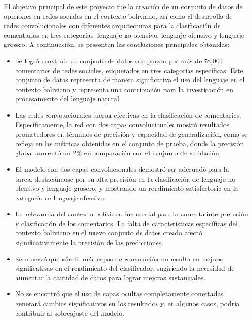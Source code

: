 El objetivo principal de este proyecto fue la creación de un conjunto de datos de opiniones en redes sociales en el contexto boliviano, así como el desarrollo de redes convolucionales con diferentes arquitecturas para la clasificación de comentarios en tres categorías: lenguaje no ofensivo, lenguaje ofensivo y lenguaje grosero. A continuación, se presentan las conclusiones principales obtenidas:

\begin{itemize}

\item Se logró construir un conjunto de datos compuesto por más de 78,000 comentarios de redes sociales, etiquetados en tres categorías específicas. Este conjunto de datos representa de manera significativa el uso del lenguaje en el contexto boliviano y representa una contribución para la investigación en procesamiento del lenguaje natural.

\item Las redes convolucionales fueron efectivas en la clasificación de comentarios. Específicamente, la red con dos capas convolucionales mostró resultados prometedores en términos de precisión y capacidad de generalización, como se refleja en las métricas obtenidas en el conjunto de prueba, donde la precisión global aumentó un 2\% en comparación con el conjunto de validación.

\item El modelo con dos capas convolucionales demostró ser adecuado para la tarea, destacándose por su alta precisión en la clasificación de lenguaje no ofensivo y lenguaje grosero, y mostrando un rendimiento satisfactorio en la categoría de lenguaje ofensivo.

\item La relevancia del contexto boliviano fue crucial para la correcta interpretación y clasificación de los comentarios. La falta de características específicas del contexto boliviano en el nuevo conjunto de datos creado afectó significativamente la precisión de las predicciones.

\item Se observó que añadir más capas de convolución no resultó en mejoras significativas en el rendimiento del clasificador, sugiriendo la necesidad de aumentar la cantidad de datos para lograr mejoras sustanciales.

\item No se encontró que el uso de capas ocultas completamente conectadas generará cambios significativos en los resultados y, en algunos casos, podría contribuir al sobreajuste del modelo.


\end{itemize}
